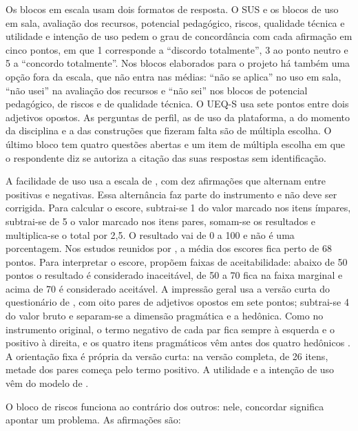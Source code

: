 Os blocos em escala usam dois formatos de resposta. O SUS e os blocos de uso em sala, avaliação dos recursos, potencial pedagógico, riscos, qualidade técnica e utilidade e intenção de uso pedem o grau de concordância com cada afirmação em cinco pontos, em que 1 corresponde a ``discordo totalmente'', 3 ao ponto neutro e 5 a ``concordo totalmente''. Nos blocos elaborados para o projeto há também uma opção fora da escala, que não entra nas médias: ``não se aplica'' no uso em sala, ``não usei'' na avaliação dos recursos e ``não sei'' nos blocos de potencial pedagógico, de riscos e de qualidade técnica. O UEQ-S usa sete pontos entre dois adjetivos opostos. As perguntas de perfil, as de uso da plataforma, a do momento da disciplina e a das construções que fizeram falta são de múltipla escolha. O último bloco tem quatro questões abertas e um item de múltipla escolha em que o respondente diz se autoriza a citação das suas respostas sem identificação.

A facilidade de uso usa a escala de , com dez afirmações que alternam entre positivas e negativas. Essa alternância faz parte do instrumento e não deve ser corrigida. Para calcular o escore, subtrai-se 1 do valor marcado nos itens ímpares, subtrai-se de 5 o valor marcado nos itens pares, somam-se os resultados e multiplica-se o total por 2,5. O resultado vai de 0 a 100 e não é uma porcentagem. Nos estudos reunidos por , a média dos escores fica perto de 68 pontos. Para interpretar o escore,  propõem faixas de aceitabilidade: abaixo de 50 pontos o resultado é considerado inaceitável, de 50 a 70 fica na faixa marginal e acima de 70 é considerado aceitável. A impressão geral usa a versão curta do questionário de , com oito pares de adjetivos opostos em sete pontos; subtrai-se 4 do valor bruto e separam-se a dimensão pragmática e a hedônica. Como no instrumento original, o termo negativo de cada par fica sempre à esquerda e o positivo à direita, e os quatro itens pragmáticos vêm antes dos quatro hedônicos \cite{schrepp2023handbook}. A orientação fixa é própria da versão curta: na versão completa, de 26 itens, metade dos pares começa pelo termo positivo. A utilidade e a intenção de uso vêm do modelo de .

O bloco de riscos funciona ao contrário dos outros: nele, concordar significa apontar um problema. As afirmações são:

